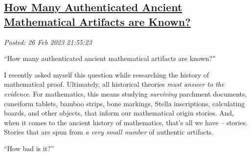 %

%
%
%

\subsection*{\href{http://analyzethedatanotthedrivel.org/2023/02/26/how-many-authenticated-ancient-mathematical-artifacts-are-known/}{How Many Authenticated Ancient Mathematical Artifacts are Known?}}


\noindent\emph{Posted: 26 Feb 2023 21:55:23}
\vspace{6pt}

``How many authenticated ancient mathematical artifacts are known?''

I recently asked myself this question while researching the history of
mathematical proof. Ultimately, all historical theories \emph{must
answer to the evidence}. For mathematics, this means studying
\emph{surviving} parchment documents, cuneiform tablets, bamboo strips,
bone markings, Stella inscriptions, calculating boards, and other
objects, that inform our mathematical origin stories. And, when it comes
to the ancient history of mathematics, that's all we have -- stories.
Stories that are spun from \emph{a very small number} of authentic
artifacts.

``How bad is it?''


